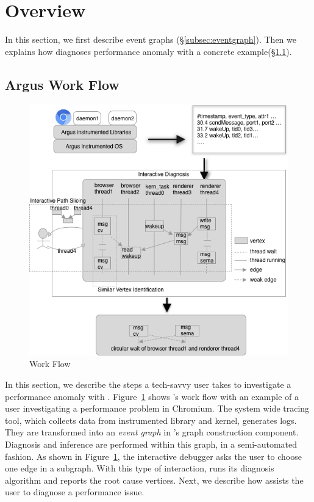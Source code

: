 \section{Overview}\label{sec:overview}

In this section, we first describe \xxx event graphs
(\S\ref{subsec:eventgraph}). Then we explains how \xxx diagnoses performance
anomaly with a concrete example(\S\ref{subsec:overflow}).



\subsection{Argus Work Flow} \label{subsec:overflow}

\begin{figure}[tb]
    \centering
	\includegraphics[width=\columnwidth]{./figures/Argus_overview.png}
    \caption{\xxx Work Flow}
    \label{fig:argus-overview}
\end{figure}

In this section, we describe the steps a tech-savvy user takes to investigate a
performance anomaly with \xxx.  Figure~\ref{fig:argus-overview} shows \xxx's
work flow with an example of a user investigating a performance problem in
Chromium.  The system wide tracing tool, which collects data from \xxx
instrumented library and kernel, generates logs. They are transformed into an
\emph{event graph} in \xxx's graph construction component. Diagnosis and
inference are performed within this graph, in a semi-automated fashion.  As
shown in Figure~\ref{fig:argus-overview}, the \xxx interactive debugger asks
the user to choose one edge in a subgraph. With this type of interaction, \xxx
runs its diagnosis algorithm and reports the root cause vertices.  Next, we
describe how \xxx assists the user to diagnose a performance issue.

